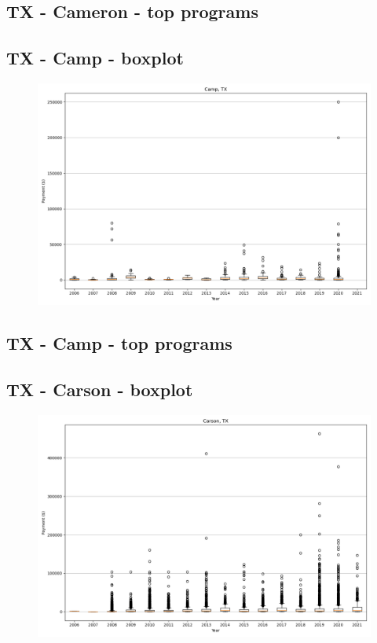 \subsection*{TX - Cameron - top programs}

\newpage
\subsection*{TX - Camp - boxplot}
\begin{figure}[h]
\centering
\includegraphics[width=7in]{../output/boxplots/counties/Camp-TX_boxplot.png}
\end{figure}


\subsection*{TX - Camp - top programs}

\newpage
\subsection*{TX - Carson - boxplot}
\begin{figure}[h]
\centering
\includegraphics[width=7in]{../output/boxplots/counties/Carson-TX_boxplot.png}
\end{figure}


